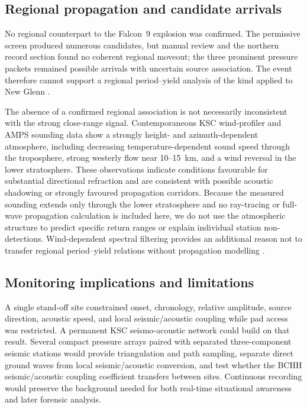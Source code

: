 \documentclass[]{seismica}
\begin{document}
\subsection{Regional propagation and candidate arrivals}

No regional counterpart to the Falcon~9 explosion was confirmed. The
permissive screen produced numerous candidates, but manual review and the
northern record section found no coherent regional moveout; the three
prominent pressure packets remained possible arrivals with uncertain source 
association. The event therefore cannot support a regional period--yield analysis 
of the kind applied to New Glenn \citep{silber_scamfer_newglenn_2026}.

The absence of a confirmed regional association is not necessarily inconsistent with the strong
close-range signal. Contemporaneous KSC wind-profiler and AMPS sounding data
show a strongly height- and azimuth-dependent atmosphere, including decreasing
temperature-dependent sound speed through the troposphere, strong westerly
flow near 10--15~km, and a wind reversal in the lower stratosphere. These
observations indicate conditions favourable for substantial directional
refraction and are consistent with possible acoustic shadowing or strongly
favoured propagation corridors. Because the measured sounding extends only
through the lower stratosphere and no ray-tracing or full-wave propagation
calculation is included here, we do not use the atmospheric structure to
predict specific return ranges or explain individual station
non-detections. Wind-dependent spectral filtering provides an additional
reason not to transfer regional period--yield relations without propagation
modelling \citep{silber_wind_filtering_2026}.

\subsection{Monitoring implications and limitations}

A single stand-off site constrained onset, chronology, relative amplitude,
source direction, acoustic speed, and local seismic/acoustic coupling while pad
access was restricted. A permanent KSC seismo-acoustic network could build on
that result. Several compact pressure arrays paired with separated
three-component seismic stations would provide triangulation and path sampling,
separate direct ground waves from local seismic/acoustic conversion, and test
whether the BCHH seismic/acoustic coupling coefficient transfers between sites. Continuous
recording would preserve the background needed for both real-time situational
awareness and later forensic analysis.
\end{document}
